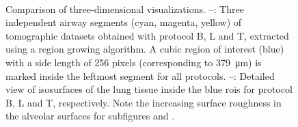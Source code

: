 \begin{figure}[htb]
{{%
			\label{subfig:roiT}%
		}%
	}%
	\\%
	\caption[Comparison of three-dimensional visualizations]{Comparison of three-dimensional visualizations. %
			--: Three independent airway segments (cyan, magenta, yellow) of tomographic datasets obtained with protocol B, L and T, extracted using a region growing algorithm. A cubic region of interest (blue) with a side length of 256 pixels (corresponding to \SI{379}{\micro\meter}) is marked inside the leftmost segment for all protocols. %
			--: Detailed view of isosurfaces of the lung tissue inside the blue \acp{roi} for protocol B, L and T, respectively. Note the increasing surface roughness in the alveolar surfaces for subfigures  and .}%
	\label{fig:BvsT}
\end{figure}%

